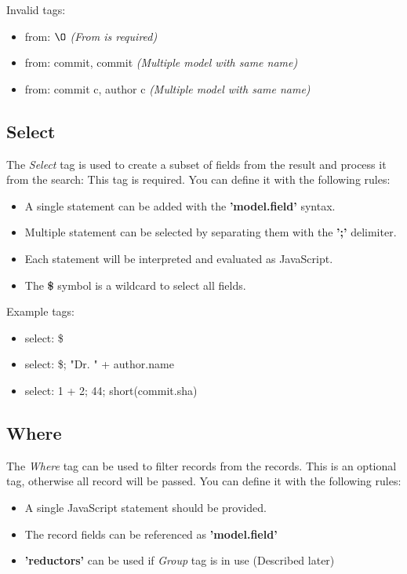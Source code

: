Invalid tags:
\begin{itemize}
	\item from: $\O$ \textit{(From is required)}
	\item from: commit, commit \textit{(Multiple model with same name)}
	\item from: commit c, author c \textit{(Multiple model with same name)}
\end{itemize}

\subsection{Select}

The \textit{Select} tag is used to create a subset of fields from the result and process it from the search:
This tag is required.
You can define it with the following rules:

\begin{itemize}
	\item A single statement can be added with the \textbf{'{model}.{field}'} syntax.
	\item Multiple statement can be selected by separating them with the \textbf{';'} delimiter.
	\item Each statement will be interpreted and evaluated as JavaScript.
	\item The \textbf{\$} symbol is a wildcard to select all fields. 
\end{itemize}

Example tags:
\begin{itemize}
	\item select: \$
	\item select: \$; "Dr. " + author.name
	\item select: 1 + 2; 44; short(commit.sha)
\end{itemize}

\subsection{Where}

The \textit{Where} tag can be used to filter records from the records.
This is an optional tag, otherwise all record will be passed.
You can define it with the following rules:

\begin{itemize}
	\item A single JavaScript statement should be provided.
	\item The record fields can be referenced as \textbf{'{model}.{field}'}
	\item \textbf{'reductors'} can be used if \textit{Group} tag is in use (Described later)
\end{itemize}

